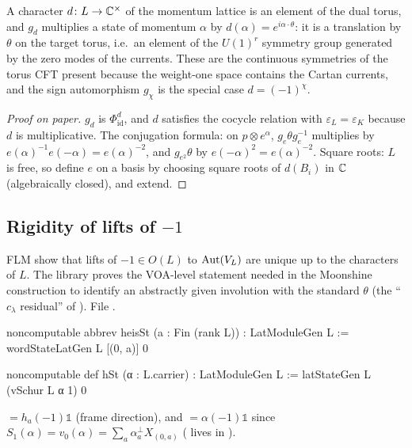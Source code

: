 \begin{physics}
A character $d\colon L\to{\mathbb{C}}^\times$ of the momentum lattice is an element of the dual torus, and $g_d$ multiplies a state of momentum $\alpha$ by $d(\alpha)=e^{i\alpha\cdot\theta}$: it is a translation by $\theta$ on the target torus, i.e.\ an element of the $U(1)^r$ symmetry group generated by the zero modes of the currents. These are the continuous symmetries of the torus CFT present because the weight-one space contains the Cartan currents, and the sign automorphism $g_\chi$ is the special case $d=(-1)^\chi$.
\end{physics}
\begin{proof}[Proof on paper]
$g_d$ is $\Phi^{d}_{\mathrm{id}}$, and $d$ satisfies the cocycle relation with $\varepsilon_L=
\varepsilon_K$ because $d$ is multiplicative. The conjugation formula: on $p\otimes e^\alpha$,
$g_e\theta g_e^{-1}$ multiplies by $e(\alpha)^{-1}e(-\alpha)=e(\alpha)^{-2}$, and $g_{e^2}\theta$
by $e(-\alpha)^2=e(\alpha)^{-2}$. Square roots: $L$ is free, so define $e$ on a basis by choosing
square roots of $d(B_i)$ in ${\mathbb{C}}$ (algebraically closed), and extend.
\end{proof}

\subsection{Rigidity of lifts of \texorpdfstring{$-1$}{-1}}\label{ch03:sec:rigidity}

FLM show that lifts of $-1\in O(L)$ to $\operatorname{Aut}(V_L)$ are unique up to the characters of $L$. The
library proves the VOA-level statement needed in the Moonshine construction to identify an
abstractly given involution with the standard $\theta$ (the ``$c_\lambda$ residual'' of
).
\noindent File .
\begin{leancode}
noncomputable abbrev heisSt (a : Fin (rank L)) : LatModuleGen L := wordStateLatGen L [(0, a)] 0

noncomputable def hSt (α : L.carrier) : LatModuleGen L := latStateGen L (vSchur L α 1) 0
\end{leancode}
 $=h_a(-1)\mathbb 1$ (frame direction), and  $=\alpha(-1)\mathbb 1$
since $S_1(\alpha)=v_0(\alpha)=\sum_a\alpha^\perp_aX_{(0,a)}$ ( lives in
).

